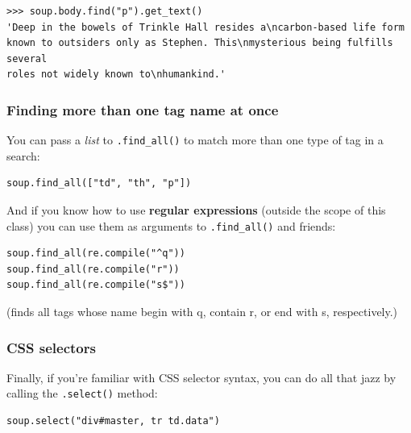\documentclass[12pt]{article}
\begin{document}
\begin{Verbatim}[fontsize=\small,samepage=true,frame=none]
>>> soup.body.find("p").get_text()
'Deep in the bowels of Trinkle Hall resides a\ncarbon-based life form
known to outsiders only as Stephen. This\nmysterious being fulfills several
roles not widely known to\nhumankind.'
\end{Verbatim}

\subsubsection{Finding more than one tag name at once}

You can pass a \textit{list} to \texttt{.find\_all()} to match more than one
type of tag in a search:

\begin{Verbatim}[fontsize=\small,samepage=true,frame=none]
soup.find_all(["td", "th", "p"])
\end{Verbatim}

And if you know how to use \textbf{regular expressions} (outside the scope of
this class) you can use them as arguments to \texttt{.find\_all()} and
friends:

\begin{Verbatim}[fontsize=\small,samepage=true,frame=none]
soup.find_all(re.compile("^q"))
soup.find_all(re.compile("r"))
soup.find_all(re.compile("s$"))
\end{Verbatim}

(finds all tags whose name begin with q, contain r, or end with s,
respectively.)

\subsubsection{CSS selectors}

Finally, if you're familiar with CSS selector syntax, you can do all that jazz
by calling the \texttt{.select()} method:

\begin{Verbatim}[fontsize=\small,samepage=true,frame=none]
soup.select("div#master, tr td.data")
\end{Verbatim}
\end{document}
